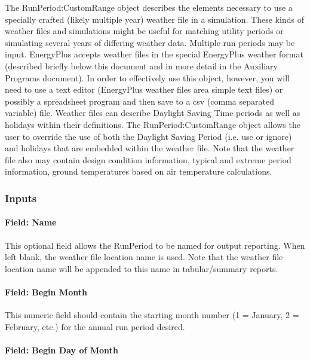 The RunPeriod:CustomRange object describes the elements necessary to use a specially crafted (likely multiple year) weather file in a simulation. These kinds of weather files and simulations might be useful for matching utility periods or simulating several years of differing weather data. Multiple run periods may be input. EnergyPlus accepts weather files in the special EnergyPlus weather format (described briefly below this document and in more detail in the Auxiliary Programs document). In order to effectively use this object, however, you will need to use a text editor (EnergyPlus weather files area simple text files) or possibly a spreadsheet program and then save to a csv (comma separated variable) file. Weather files can describe Daylight Saving Time periods as well as holidays within their definitions. The RunPeriod:CustomRange object allows the user to override the use of both the Daylight Saving Period (i.e. use or ignore) and holidays that are embedded within the weather file. Note that the weather file also may contain design condition information, typical and extreme period information, ground temperatures based on air temperature calculations.

\subsubsection{Inputs}\label{inputs-5-016}

\paragraph{Field: Name}\label{field-name-5-012}

This optional field allows the RunPeriod to be named for output reporting. When left blank, the weather file location name is used. Note that the weather file location name will be appended to this name in tabular/summary reports.

\paragraph{Field: Begin Month}\label{field-begin-month-2}

This numeric field should contain the starting month number (1 = January, 2 = February, etc.) for the annual run period desired.

\paragraph{Field: Begin Day of Month}\label{field-begin-day-of-month-2}

